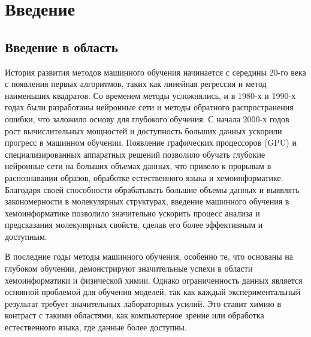 \section{Введение}
\label{sec:Chapter0} 
\subsection{Введение в область}
История развития методов машинного обучения начинается с середины 20-го века с появления первых алгоритмов, таких как линейная регрессия и метод наименьших квадратов. Со временем методы усложнялись, и в 1980-х и 1990-х годах были разработаны нейронные сети и методы обратного распространения ошибки, что заложило основу для глубокого обучения. С начала 2000-х годов рост вычислительных мощностей и доступность больших данных ускорили прогресс в машинном обучении. Появление графических процессоров (GPU) и специализированных аппаратных решений позволило обучать глубокие нейронные сети на больших объемах данных, что привело к прорывам в распознавании образов, обработке естественного языка и хемоинформатике. 
Благодаря своей способности обрабатывать большие объемы данных и выявлять закономерности в молекулярных структурах, введение машинного обучения в хемоинформатике позволило значительно ускорить процесс анализа и предсказания молекулярных свойств, сделав его более эффективным и доступным.

В последние годы методы машинного обучения, особенно те, что основаны на глубоком обучении, демонстрируют значительные успехи в области хемоинформатики и физической химии. Однако ограниченность данных является основной проблемой для обучения моделей, так как каждый экспериментальный результат требует значительных лабораторных усилий. Это ставит химию в контраст с такими областями, как компьютерное зрение или обработка естественного языка, где данные более доступны.

